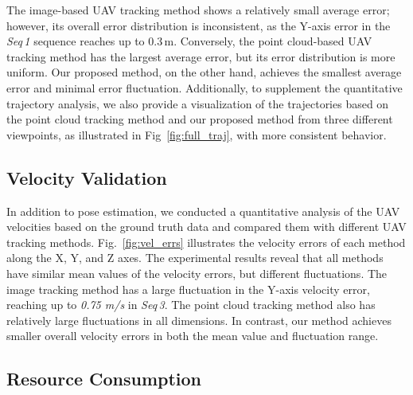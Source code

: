 The image-based UAV tracking method shows a relatively small average error; however, its overall error distribution is inconsistent, as the Y-axis error in the \textit{Seq\,1} sequence reaches up to 0.3\,m. Conversely, the point cloud-based UAV tracking method has the largest average error, but its error distribution is more uniform. Our proposed method, on the other hand, achieves the smallest average error and minimal error fluctuation. Additionally, to supplement the quantitative trajectory analysis, we also provide a visualization of the trajectories based on the point cloud tracking method and our proposed method from three different viewpoints, as illustrated in Fig~\ref{fig:full_traj}, with more consistent behavior.


\subsection{Velocity Validation}

In addition to pose estimation, we conducted a quantitative analysis of the UAV velocities based on the ground truth data and compared them with different UAV tracking methods. Fig.~\ref{fig:vel_errs} illustrates the velocity errors of each method along the X, Y, and Z axes. The experimental results reveal that all methods have similar mean values of the velocity errors, but different fluctuations. The image tracking method has a large fluctuation in the Y-axis velocity error, reaching up to \textit{0.75 m/s} in \textit{Seq\,3}. The point cloud tracking method also has relatively large fluctuations in all dimensions. In contrast, our method achieves smaller overall velocity errors in both the mean value and fluctuation range.

\subsection{Resource Consumption}

